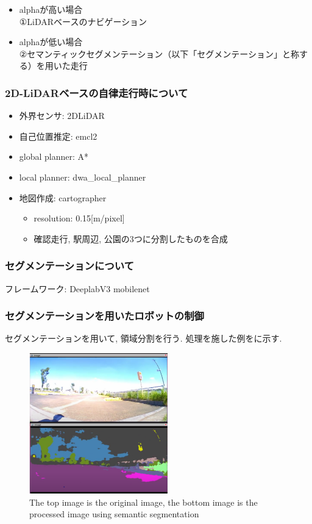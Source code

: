 \documentclass[uplatex, twocolumn, 9pt]{jsproceedings}
\begin{document}
\newpage

\begin{itemize}
  \item alphaが高い場合\\
  ①LiDARベースのナビゲーション
  \item alphaが低い場合\\
  ②セマンティックセグメンテーション（以下「セグメンテーション」と称する）を用いた走行
\end{itemize}

\subsubsection{2D-LiDARベースの自律走行時について}

\begin{itemize}
  \item 外界センサ: 2DLiDAR
  \item 自己位置推定: emcl2
  \item global planner: A*
  \item local planner: dwa\_local\_planner
  \item 地図作成: cartographer
  \begin{itemize}
    \item resolution: 0.15[m/pixel]
    \item 確認走行, 駅周辺, 公園の3つに分割したものを合成
  \end{itemize}
\end{itemize}

\subsubsection{セグメンテーションについて}
フレームワーク: DeeplabV3 mobilenet
\subsubsection{セグメンテーションを用いたロボットの制御}
セグメンテーションを用いて, 領域分割を行う. 処理を施した例をに示す.

\begin{figure}[h]
  \centering
  \includegraphics[width=60mm]{fig/camera_for_seg.pdf}
  \caption{The top image is the original image, the bottom image is the processed image using semantic segmentation}
  \label{fig:for_seg}%
\end{figure}
\end{document}
